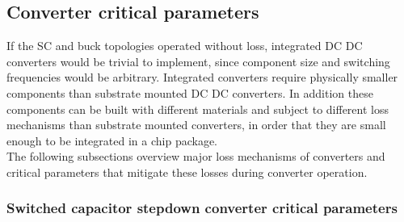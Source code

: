 \documentclass[letterpaper,twocolumn,10pt]{article}
\begin{document}
\subsection{Converter critical parameters}
If the SC and buck topologies operated without loss, integrated DC DC converters would be trivial to implement, since component size and switching frequencies would be arbitrary. Integrated converters require physically smaller components than substrate mounted DC DC converters. In addition these components can be built with different materials and subject to different loss mechanisms than substrate mounted converters, in order that they are small enough to be integrated in a chip package.\\
The following subsections overview major loss mechanisms of converters and critical parameters that mitigate these losses during converter operation.

\subsubsection{Switched capacitor stepdown converter critical parameters}
\end{document}
